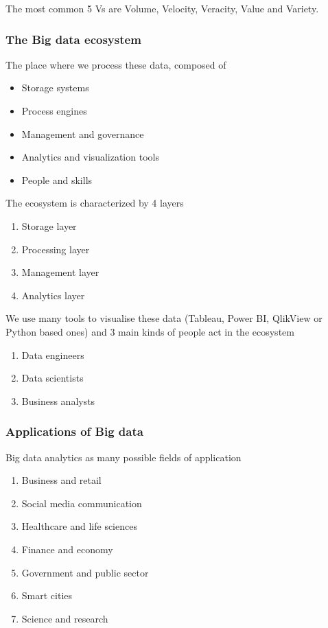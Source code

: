 The most common 5 Vs are Volume, Velocity, Veracity, Value and Variety. 


\subsubsection{The Big data ecosystem}

The place where we process these data, composed of

\begin{itemize}
    \item Storage systems
    \item Process engines
    \item Management and governance
    \item Analytics and visualization tools
    \item People and skills
\end{itemize}

The ecosystem is characterized by 4 layers

\begin{enumerate}
    \item Storage layer
    \item Processing layer
    \item Management layer
    \item Analytics layer
\end{enumerate}

We use many tools to visualise these data (Tableau, Power BI, QlikView or Python based ones) and 3 main kinds of people act in the ecosystem

\begin{enumerate}
    \item Data engineers
    \item Data scientists
    \item Business analysts
\end{enumerate}

\subsubsection{Applications of Big data}

Big data analytics as many possible fields of application

\begin{enumerate}
    \item Business and retail
    \item Social media communication
    \item Healthcare and life sciences
    \item Finance and economy
    \item Government and public sector
    \item Smart cities
    \item Science and research
\end{enumerate}

